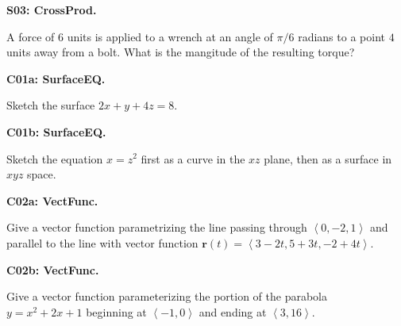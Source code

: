 \documentclass[12pt]{article}
\newcommand{\vect}{\mathbf}
\newcommand{\<}{\left\langle}
\renewcommand{\>}{\right\rangle}
\newcommand{\exerciseHeader}[4]{


  \vspace{0.5em}
  \textbf{#2}
  \vspace{0.5em}

}
\begin{document}
\begin{multicols}{2}
\exerciseHeader{2017 June 07}{S03: CrossProd.}{
Compute and apply the cross product of two vectors.
}{3/3}

A force of \(6\) units is applied to a wrench at an angle of \(\pi/6\)
radians to a point \(4\) units away from a bolt.
What is the mangitude of the resulting torque?



%

%
%
%
%
%
%

\exerciseHeader{2017 June 09}{C01a: SurfaceEQ.}{
Identify and sketch surfaces in three-dimensional Euclidean space.
}{3/4}

Sketch the surface \(2x+y+4z=8\).

\exerciseHeader{2017 June 12}{C01b: SurfaceEQ.}{
Identify and sketch surfaces in three-dimensional Euclidean space.
}{4/4}

Sketch the equation \(x=z^2\) first as a curve in the \(xz\) plane,
then as a surface in \(xyz\) space.



\exerciseHeader{2017 June 08}{C02a: VectFunc.}{
Model curves in Euclidean space with vector functions.
}{1/4}

Give a vector function parametrizing the line passing through
\(\<0,-2,1\>\) and parallel to the line with vector function
\(\vect r(t)=\<3-2t,5+3t,-2+4t\>\).

\exerciseHeader{2017 June 09}{C02b: VectFunc.}{
Model curves in Euclidean space with vector functions.
}{2/4}

Give a vector function parameterizing the portion of the parabola \(y=x^2+2x+1\)
beginning at \(\<-1,0\>\) and ending at \(\<3,16\>\).

%


\end{multicols}
\end{document}
